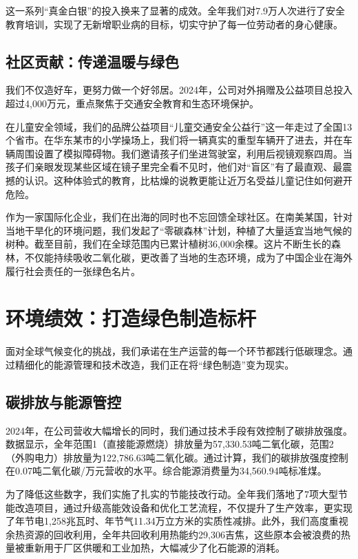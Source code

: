 \documentclass[a4paper,12pt]{article}
\begin{document}
这一系列“真金白银”的投入换来了显著的成效。全年我们对7.9万人次进行了安全教育培训，实现了无新增职业病的目标，切实守护了每一位劳动者的身心健康。

\subsection{社区贡献：传递温暖与绿色}

我们不仅造好车，更努力做一个好邻居。2024年，公司对外捐赠及公益项目总投入超过4,000万元，重点聚焦于交通安全教育和生态环境保护。

在儿童安全领域，我们的品牌公益项目“儿童交通安全公益行”这一年走过了全国13个省市。在华东某市的小学操场上，我们将一辆真实的重型车辆开了进去，并在车辆周围设置了模拟障碍物。我们邀请孩子们坐进驾驶室，利用后视镜观察四周。当孩子们亲眼发现某些区域在镜子里完全看不见时，他们对“盲区”有了最直观、最震撼的认识。这种体验式的教育，比枯燥的说教更能让近万名受益儿童记住如何避开危险。

作为一家国际化企业，我们在出海的同时也不忘回馈全球社区。在南美某国，针对当地干旱化的环境问题，我们发起了“零碳森林”计划，种植了大量适宜当地气候的树种。截至目前，我们在全球范围内已累计植树36,000余棵。这片不断生长的森林，不仅能持续吸收二氧化碳，更改善了当地的生态环境，成为了中国企业在海外履行社会责任的一张绿色名片。

\section{环境绩效：打造绿色制造标杆}

面对全球气候变化的挑战，我们承诺在生产运营的每一个环节都践行低碳理念。通过精细化的能源管理和技术改造，我们正在将“绿色制造”变为现实。

\subsection{碳排放与能源管控}

2024年，在公司营收大幅增长的同时，我们通过技术手段有效控制了碳排放强度。数据显示，全年范围1（直接能源燃烧）排放量为57,330.53吨二氧化碳，范围2（外购电力）排放量为122,786.63吨二氧化碳。通过计算，我们的碳排放强度控制在0.07吨二氧化碳/万元营收的水平。综合能源消费量为34,560.94吨标准煤。

为了降低这些数字，我们实施了扎实的节能技改行动。全年我们落地了7项大型节能改造项目，通过升级高能效设备和优化工艺流程，不仅提升了生产效率，更实现了年节电1,258兆瓦时、年节气11.34万立方米的实质性减排。此外，我们高度重视余热资源的回收利用，全年共回收利用热能约29,306吉焦，这些原本会被浪费的热量被重新用于厂区供暖和工业加热，大幅减少了化石能源的消耗。
\end{document}

